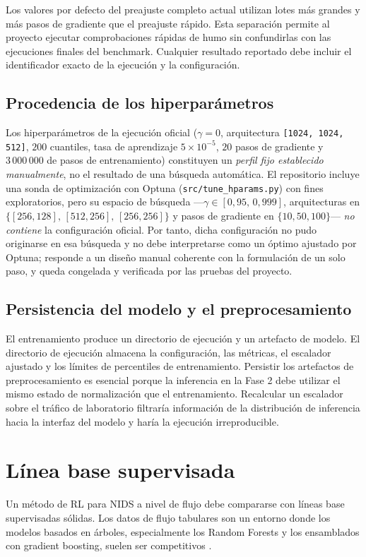 Los valores por defecto del preajuste completo actual utilizan lotes más grandes y más pasos de gradiente que el preajuste rápido. Esta separación permite al proyecto ejecutar comprobaciones rápidas de humo sin confundirlas con las ejecuciones finales del benchmark. Cualquier resultado reportado debe incluir el identificador exacto de la ejecución y la configuración.

\subsection{Procedencia de los hiperparámetros}
Los hiperparámetros de la ejecución oficial ($\gamma = 0$, arquitectura \texttt{[1024, 1024, 512]}, $200$ cuantiles, tasa de aprendizaje $5\times10^{-5}$, $20$ pasos de gradiente y $3\,000\,000$ de pasos de entrenamiento) constituyen un \emph{perfil fijo establecido manualmente}, no el resultado de una búsqueda automática. El repositorio incluye una sonda de optimización con Optuna (\texttt{src/tune\_hparams.py}) con fines exploratorios, pero su espacio de búsqueda —$\gamma \in [0{,}95,\,0{,}999]$, arquitecturas en $\{[256,128],\,[512,256],\,[256,256]\}$ y pasos de gradiente en $\{10,50,100\}$— \emph{no contiene} la configuración oficial. Por tanto, dicha configuración no pudo originarse en esa búsqueda y no debe interpretarse como un óptimo ajustado por Optuna; responde a un diseño manual coherente con la formulación de un solo paso, y queda congelada y verificada por las pruebas del proyecto.

\subsection{Persistencia del modelo y el preprocesamiento}
El entrenamiento produce un directorio de ejecución y un artefacto de modelo. El directorio de ejecución almacena la configuración, las métricas, el escalador ajustado y los límites de percentiles de entrenamiento. Persistir los artefactos de preprocesamiento es esencial porque la inferencia en la Fase 2 debe utilizar el mismo estado de normalización que el entrenamiento. Recalcular un escalador sobre el tráfico de laboratorio filtraría información de la distribución de inferencia hacia la interfaz del modelo y haría la ejecución irreproducible.

\section{Línea base supervisada}
Un método de RL para NIDS a nivel de flujo debe compararse con líneas base supervisadas sólidas. Los datos de flujo tabulares son un entorno donde los modelos basados en árboles, especialmente los Random Forests y los ensamblados con gradient boosting, suelen ser competitivos \parencite{LiuLang2019IDSSurvey,Apruzzese2022CrossEvaluationNIDS}.

